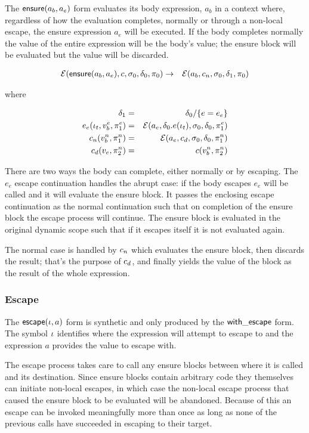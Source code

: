 \documentclass{article}
\begin{document}
The $\mathsf{ensure}(a_b, a_e) $ form evaluates its body expression, $a_b$ in a
context where, regardless of how the evaluation completes, normally or through a
non-local escape, the ensure expression $a_e $ will be executed. If the body
completes normally the value of the entire expression will be the body's value;
the ensure block will be evaluated but the value will be discarded.

\begin{eqnarray*}
\mathcal{E}(\mathsf{ensure}(a_b, a_e), c, \sigma_0, \delta_0, \pi_0) & \to &
\mathcal{E}(a_b, c_n, \sigma_0, \delta_1, \pi_0)
\end{eqnarray*}

where

\begin{eqnarray*}
\delta_1 & = & \delta_0 / \{ e = e_e \} \\
e_e(\iota_t, v^e_b, \pi^e_1) & = & \mathcal{E}(a_e, \delta_0.e(\iota_t), \sigma_0, \delta_0, \pi^e_1) \\
c_n(v^n_b, \pi^n_1) & = & \mathcal{E}(a_e, c_d, \sigma_0, \delta_0, \pi^n_1) \\
c_d(v_e, \pi^n_2) & = & c(v^n_b, \pi^n_2)
\end{eqnarray*}

There are two ways the body can complete, either normally or by escaping. The
$e_e$ escape continuation handles the abrupt case: if the body escapes $e_e$
will be called and it will evaluate the ensure block. It passes the enclosing
escape continuation as the normal continuation such that on completion of the
ensure block the escape process will continue. The ensure block is evaluated in
the original dynamic scope such that if it escapes itself it is not evaluated
again.

The normal case is handled by $c_n$ which evaluates the ensure block, then
discards the result; that's the purpose of $c_d$, and finally yields the
value of the block as the result of the whole expression.

\subsubsection{Escape}

The $\mathsf{escape}(\iota, a)$ form is synthetic and only produced by the
$\mathsf{with\_escape}$ form. The symbol $\iota$ identifies where the expression
will attempt to escape to and the expression $a$ provides the value to escape
with.

The escape process takes care to call any ensure blocks between where it is
called and its destination. Since ensure blocks contain arbitrary code they
themselves can initiate non-local escapes, in which case the non-local escape
process that caused the ensure block to be evaluated will be abandoned. Because
of this an escape can be invoked meaningfully more than once as long as none of
the previous calls have succeeded in escaping to their target.
\end{document}
